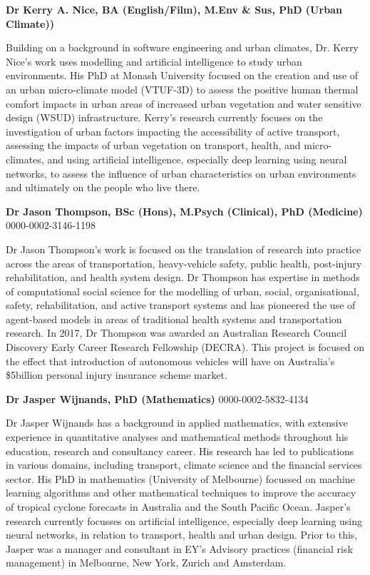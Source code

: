 \documentclass[Crown,sageh,times]{sagej}
\begin{document}
  
  

\begin{biogs}
\textbf{Dr Kerry A. Nice, BA (English/Film), M.Env \& Sus, PhD (Urban Climate))}

Building on a background in software engineering and urban climates, Dr. Kerry Nice's work uses modelling and artificial intelligence to study urban environments. His PhD at Monash University focused on the creation and use of an urban micro-climate model (VTUF-3D) to assess the positive human thermal comfort impacts in urban areas of increased urban vegetation and water sensitive design (WSUD) infrastructure. Kerry's research currently focuses on the investigation of urban factors impacting the accessibility of active transport, assessing the impacts of urban vegetation on transport, health, and micro-climates, and using artificial intelligence, especially deep learning using neural networks, to assess the influence of urban characteristics on urban environments and ultimately on the people who live there.

\textbf{Dr Jason Thompson, BSc (Hons), M.Psych (Clinical), PhD (Medicine)}
0000-0002-3146-1198

Dr Jason Thompson’s work is focused on the translation of research into practice across the areas of transportation, heavy-vehicle safety, public health, post-injury rehabilitation, and health system design. Dr Thompson has expertise in methods of computational social science for the modelling of urban, social, organisational, safety, rehabilitation, and active transport systems and has pioneered the use of agent-based models in areas of traditional health systems and transportation research. In 2017, Dr Thompson was awarded an Australian Research Council Discovery Early Career Research Fellowship (DECRA). This project is focused on the effect that introduction of autonomous vehicles will have on Australia’s \$5billion personal injury insurance scheme market.

\textbf{Dr Jasper Wijnands, PhD (Mathematics)}
0000-0002-5832-4134

Dr Jasper Wijnands has a background in applied mathematics, with extensive experience in quantitative analyses and mathematical methods throughout his education, research and consultancy career. His research has led to publications in various domains, including transport, climate science and the financial services sector. His PhD in mathematics (University of Melbourne) focussed on machine learning algorithms and other mathematical techniques to improve the accuracy of tropical cyclone forecasts in Australia and the South Pacific Ocean. Jasper’s research currently focusses on artificial intelligence, especially deep learning using neural networks, in relation to transport, health and urban design. Prior to this, Jasper was a manager and consultant in EY’s Advisory practices (financial risk management) in Melbourne, New York, Zurich and Amsterdam.


\end{biogs}
\end{document}
